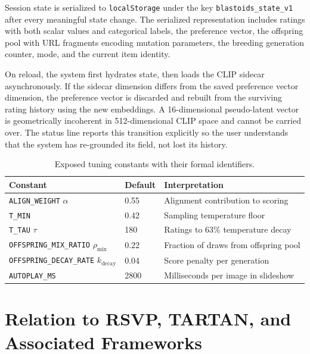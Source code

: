 \documentclass[12pt, a4paper]{article}
\theoremstyle{definition}
\begin{document}
Session state is serialized to \texttt{localStorage} under the key \texttt{blastoids\_state\_v1} after every meaningful state change. The serialized representation includes ratings with both scalar values and categorical labels, the preference vector, the offspring pool with URL fragments encoding mutation parameters, the breeding generation counter, mode, and the current item identity.

On reload, the system first hydrates state, then loads the CLIP sidecar asynchronously. If the sidecar dimension differs from the saved preference vector dimension, the preference vector is discarded and rebuilt from the surviving rating history using the new embeddings. A 16-dimensional pseudo-latent vector is geometrically incoherent in 512-dimensional CLIP space and cannot be carried over. The status line reports this transition explicitly so the user understands that the system has re-grounded its field, not lost its history.

\begin{table}[H]
\centering
\begin{tabular}{lll}
\toprule
\textbf{Constant} & \textbf{Default} & \textbf{Interpretation} \\
\midrule
\texttt{ALIGN\_WEIGHT} $\alpha$ & 0.55 & Alignment contribution to scoring \\
\texttt{T\_MIN} & 0.42 & Sampling temperature floor \\
\texttt{T\_TAU} $\tau$ & 180 & Ratings to 63\% temperature decay \\
\texttt{OFFSPRING\_MIX\_RATIO} $\rho_{\mathrm{mix}}$ & 0.22 & Fraction of draws from offspring pool \\
\texttt{OFFSPRING\_DECAY\_RATE} $k_{\mathrm{decay}}$ & 0.04 & Score penalty per generation \\
\texttt{AUTOPLAY\_MS} & 2800 & Milliseconds per image in slideshow \\
\bottomrule
\end{tabular}
\caption{Exposed tuning constants with their formal identifiers.}
\end{table}

\section{Relation to RSVP, TARTAN, and Associated Frameworks}
\end{document}
